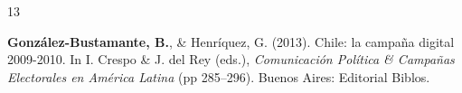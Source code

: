 \begin{publications}
\begin{benumerate}{13}

\item{{\bfseries González-Bustamante, B.}, \& Henríquez, G. (2013). Chile: la campaña digital 2009-2010. In I. Crespo \& J. del Rey (eds.), {\itshape Comunicación Política \& Campañas Electorales en América Latina} (pp 285--296). Buenos Aires: Editorial Biblos.}\vspace{1mm}

\end{benumerate}

\end{publications}
